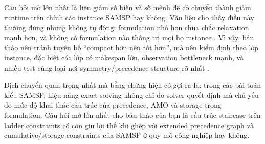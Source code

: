 Câu hỏi mở lớn nhất là liệu giảm số biến và số mệnh đề có chuyển thành giảm runtime trên chính các instance SAMSP hay không. Văn liệu cho thấy điều này thường đúng nhưng không tự động: formulation nhỏ hơn chưa chắc relaxation mạnh hơn, và không có formulation nào thống trị mọi họ instance  \cite{Koné2009Event-based} \cite{Caselli2023Exact}. Vì vậy, bản thảo nên tránh tuyên bố “compact hơn nên tốt hơn”, mà nên kiểm định theo lớp instance, đặc biệt các lớp có makespan lớn, observation bottleneck mạnh, và nhiều test cùng loại nơi symmetry/precedence structure rõ nhất  \cite{Bofill2022The}.


Dịch chuyển quan trọng nhất mà bằng chứng hiện có gợi ra là: trong các bài toán kiểu SAMSP, hiệu năng exact solving không chỉ do solver quyết định mà chủ yếu do mức độ khai thác cấu trúc của precedence, AMO và storage trong formulation. Câu hỏi mở lớn nhất cho bản thảo của bạn là cấu trúc staircase trên ladder constraints có còn giữ lợi thế khi ghép với extended precedence graph và cumulative/storage constraints của SAMSP ở quy mô công nghiệp hay không.




